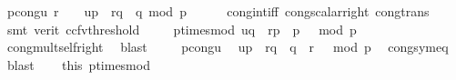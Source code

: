 \begin{isabellebody}
\ p{\isacharunderscore}{\kern0pt}cong{\isacharunderscore}{\kern0pt}u{\isacharcolon}{\kern0pt}\ {\isachardoublequoteopen}{\isacharbrackleft}{\kern0pt}{\isacharparenleft}{\kern0pt}r\ {\isacharcircum}{\kern0pt}\ {}{\isacharparenright}{\kern0pt}\ {\isacharequal}{\kern0pt}\ {\isacharquery}{\kern0pt}up\ {\isacharasterisk}{\kern0pt}\ r{\isacharunderscore}{\kern0pt}q\ {\isacharasterisk}{\kern0pt}\ q{\isacharbrackright}{\kern0pt}\ {\isacharparenleft}{\kern0pt}mod\ p{\isacharparenright}{\kern0pt}{\isachardoublequoteclose}\isanewline
\ \ \ \ \isamarkupfalse%
\ cong{\isacharunderscore}{\kern0pt}int{\isacharunderscore}{\kern0pt}iff\ cong{\isacharunderscore}{\kern0pt}scalar{\isacharunderscore}{\kern0pt}right\ cong{\isacharunderscore}{\kern0pt}trans\isanewline
\ \ \isamarkupfalse%
\ {\isacharparenleft}{\kern0pt}smt\ {\isacharparenleft}{\kern0pt}verit{\isacharcomma}{\kern0pt}\ ccfv{\isacharunderscore}{\kern0pt}threshold{\isacharparenright}{\kern0pt}\ {\isacharparenright}{\kern0pt}\isanewline
\isanewline
\ \ \isamarkupfalse%
\ p{\isacharunderscore}{\kern0pt}times{\isacharunderscore}{\kern0pt}mod{\isacharunderscore}{\kern0pt}{}{\isacharcolon}{\kern0pt}\ {\isachardoublequoteopen}{\isacharbrackleft}{\kern0pt}{\isacharquery}{\kern0pt}uq\ {\isacharasterisk}{\kern0pt}\ r{\isacharunderscore}{\kern0pt}p\ {\isacharasterisk}{\kern0pt}\ p\ {\isacharequal}{\kern0pt}\ {}{\isacharbrackright}{\kern0pt}\ {\isacharparenleft}{\kern0pt}mod\ p{\isacharparenright}{\kern0pt}{\isachardoublequoteclose}\isanewline
\ \ \ \ \isamarkupfalse%
\ cong{\isacharunderscore}{\kern0pt}mult{\isacharunderscore}{\kern0pt}self{\isacharunderscore}{\kern0pt}right\ \isamarkupfalse%
\ blast\ \isanewline
\ \ \isamarkupfalse%
\ p{\isacharunderscore}{\kern0pt}cong{\isacharunderscore}{\kern0pt}u\ \isamarkupfalse%
\ {\isachardoublequoteopen}{\isacharbrackleft}{\kern0pt}{\isacharquery}{\kern0pt}up\ {\isacharasterisk}{\kern0pt}\ r{\isacharunderscore}{\kern0pt}q\ {\isacharasterisk}{\kern0pt}\ q\ {\isacharequal}{\kern0pt}\ {\isacharparenleft}{\kern0pt}r\ {\isacharcircum}{\kern0pt}\ {}{\isacharparenright}{\kern0pt}{\isacharbrackright}{\kern0pt}\ {\isacharparenleft}{\kern0pt}mod\ p{\isacharparenright}{\kern0pt}{\isachardoublequoteclose}\ \isamarkupfalse%
\ cong{\isacharunderscore}{\kern0pt}sym{\isacharunderscore}{\kern0pt}eq\ \isamarkupfalse%
\ blast\isanewline
\ \ \isamarkupfalse%
\ this\ p{\isacharunderscore}{\kern0pt}times{\isacharunderscore}{\kern0pt}mod{\isacharunderscore}{\kern0pt}{}\ \isamarkupfalse%

\end{isabellebody}
